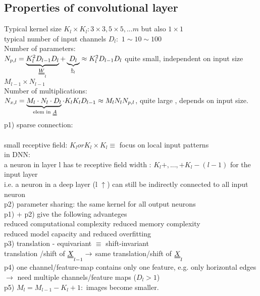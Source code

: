 \subsection{Properties of convolutional layer}
Typical kernel size $  K_l \times K_l  : 3 \times 3,  5 \times 5 , ... m $ but also $  1 \times 1  $\\
typical number of input channels $  D_l :  $ $  1 \sim 10 \sim 100  $\\
Number of parameters: \\
$ N_{p,l } =\underbrace{ K_l ^2 D_{l-1} D_l}_{\W_l} +\underbrace{ D_l}_{\b_l} \approx K_l ^2 D_{l-1 } D_l $
quite small, independent on input size $  M_{l-1} \times N_{l-1 } $\\
Number of multiplications:\\
$  N_{x,l} = \underbrace{M_l \cdot N_l \cdot D_l}_{ \text { elem in } \A}  \cdot K_l K_l D_{l-1} \approx M_l N_l N_{p,l} $, quite large , depends on input size.\\
\textbullet p1) sparse connection: \\
 \\
small receptive field: $  K_l or K_l \times K_l  \equiv $ focus on local input patterns\\
in DNN:
 \\
a neuron in layer l has te receptive field width : $  K_l +, ... ,+ K_l - (l-1) $  for the input layer\\
i.e. a neuron in a deep layer (l $  \uparrow  $) can still be indirectly connected to all input neuron \\
p2) parameter sharing: the same kernel for all output neurons \\
\textbullet p1) + p2) give the following advanteges \\
\textbullet reduced computational complexity reduced memory complexity \\
\textbullet reduced model capacity and reduced overfitting\\
\textbullet p3) translation - equivariant $  \equiv  $ shift-invariant \\
translation /shift of $  \X_{l-1} \rightarrow  $ same translation/shift of $ \X_l $\\
\textbullet p4) one channel/feature-map contains only one feature, e.g. only horizontal edges \\
$ \rightarrow $ need multiple channels/feature maps ($ D_l > 1  $) \\
\textbullet p5) $  M_l = M_{l-1 }  - K_l + 1 :  $ images become smaller.


















